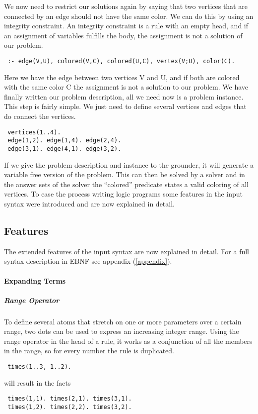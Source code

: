 \documentclass[a4paper,10pt]{article}
\begin{document}
We now need to restrict our solutions again by saying that two vertices that are connected by an edge should not have the same color.
We can do this by using an integrity constraint.
An integrity constraint is a rule with an empty head, and if an assignment of variables fulfills the body, the assignment is not a solution of our problem.
\begin{verbatim}
 :- edge(V,U), colored(V,C), colored(U,C), vertex(V;U), color(C).
\end{verbatim}
Here we have the edge between two vertices V and U, and if both are colored with the same color C the assignment is not a solution to our problem.
\newline
We have finally written our problem description, all we need now is a problem instance. This step is fairly simple.
We just need to define several vertices and edges that do connect the vertices.
\begin{verbatim}
 vertices(1..4).
 edge(1,2). edge(1,4). edge(2,4).
 edge(3,1). edge(4,1). edge(3,2).
\end{verbatim}

If we give the problem description and instance to the grounder, it will generate a variable free version of the problem. This can then be solved by a solver and in the answer sets of the solver the ``colored'' predicate states a valid coloring of all vertices.
\newline
To ease the process writing logic programs some features in the input syntax were introduced and are now explained in detail.
\subsection{Features}
The extended features of the input syntax are now explained in detail. For a full syntax description in EBNF see appendix (\ref{appendix}).
\paragraph{Expanding Terms}
\subparagraph{Range Operator}
To define several atoms that stretch on one or more parameters over a certain range, two dots can be used to express an increasing integer range.
Using the range operator in the head of a rule, it works as a conjunction of all the members in the range, so for every number the rule is duplicated.
\begin{verbatim}
 times(1..3, 1..2).
\end{verbatim}
will result in the facts
\begin{verbatim}
 times(1,1). times(2,1). times(3,1).
 times(1,2). times(2,2). times(3,2).
\end{verbatim}
\end{document}
